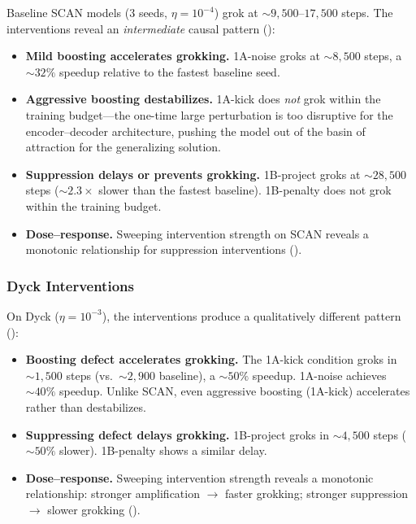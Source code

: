 \documentclass[11pt]{article}
\begin{document}
Baseline SCAN models (3 seeds, $\eta = 10^{-4}$) grok at ${\sim}9{,}500$--$17{,}500$ steps. The interventions reveal an \emph{intermediate} causal pattern ():
\begin{itemize}
  \item \textbf{Mild boosting accelerates grokking.} 1A-noise groks at ${\sim}8{,}500$ steps, a ${\sim}32\%$ speedup relative to the fastest baseline seed.
  \item \textbf{Aggressive boosting destabilizes.} 1A-kick does \emph{not} grok within the training budget---the one-time large perturbation is too disruptive for the encoder--decoder architecture, pushing the model out of the basin of attraction for the generalizing solution.
  \item \textbf{Suppression delays or prevents grokking.} 1B-project groks at ${\sim}28{,}500$ steps (${\sim}2.3\times$ slower than the fastest baseline). 1B-penalty does not grok within the training budget.
  \item \textbf{Dose--response.} Sweeping intervention strength on SCAN reveals a monotonic relationship for suppression interventions ().
\end{itemize}

\subsubsection{Dyck Interventions}

On Dyck ($\eta = 10^{-3}$), the interventions produce a qualitatively different pattern ():
\begin{itemize}
  \item \textbf{Boosting defect accelerates grokking.} The 1A-kick condition groks in ${\sim}1{,}500$ steps (vs.\ ${\sim}2{,}900$ baseline), a ${\sim}50\%$ speedup. 1A-noise achieves ${\sim}40\%$ speedup. Unlike SCAN, even aggressive boosting (1A-kick) accelerates rather than destabilizes.
  \item \textbf{Suppressing defect delays grokking.} 1B-project groks in ${\sim}4{,}500$ steps (${\sim}50\%$ slower). 1B-penalty shows a similar delay.
  \item \textbf{Dose--response.} Sweeping intervention strength reveals a monotonic relationship: stronger amplification $\rightarrow$ faster grokking; stronger suppression $\rightarrow$ slower grokking ().
\end{itemize}
\end{document}
